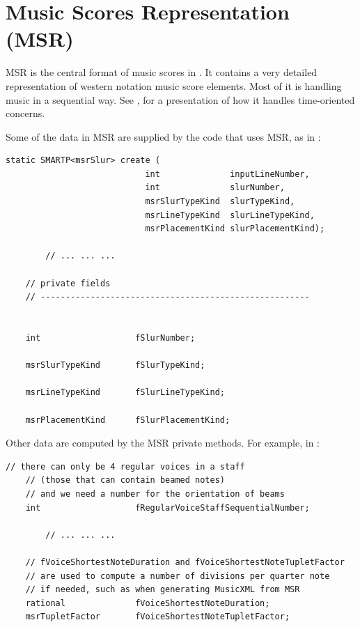 
\chapter{Music Scores Representation (MSR)}

MSR is the central format of music scores in \mf. It contains a very detailed representation of western notation music score elements. Most of it is handling music in a sequential way. See , for a presentation of how it handles time-oriented concerns.

Some of the data in MSR are supplied by the code that uses MSR, as in :
\begin{lstlisting}[language=CPlusPlus]
    static SMARTP<msrSlur> create (
                            int              inputLineNumber,
                            int              slurNumber,
                            msrSlurTypeKind  slurTypeKind,
                            msrLineTypeKind  slurLineTypeKind,
                            msrPlacementKind slurPlacementKind);

		// ... ... ...

    // private fields
    // ------------------------------------------------------


    int                   fSlurNumber;

    msrSlurTypeKind       fSlurTypeKind;

    msrLineTypeKind       fSlurLineTypeKind;

    msrPlacementKind      fSlurPlacementKind;
\end{lstlisting}

Other data are computed by the MSR private methods. For example, in :
\begin{lstlisting}[language=CPlusPlus]
    // there can only be 4 regular voices in a staff
    // (those that can contain beamed notes)
    // and we need a number for the orientation of beams
    int                   fRegularVoiceStaffSequentialNumber;

		// ... ... ...

    // fVoiceShortestNoteDuration and fVoiceShortestNoteTupletFactor
    // are used to compute a number of divisions per quarter note
    // if needed, such as when generating MusicXML from MSR
    rational              fVoiceShortestNoteDuration;
    msrTupletFactor       fVoiceShortestNoteTupletFactor;
\end{lstlisting}

